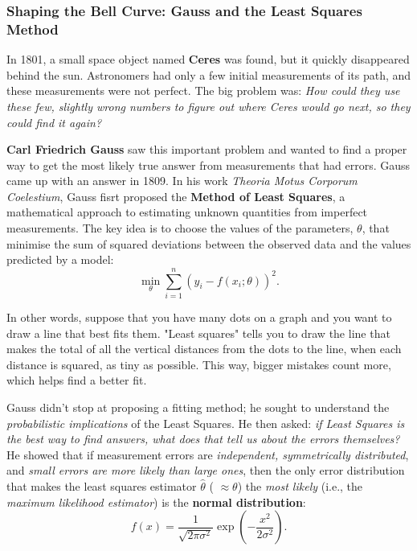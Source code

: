 \vspace{-1em}

\subsubsection{Shaping the Bell Curve: Gauss and the Least Squares Method}

In 1801, a small space object named \textbf{Ceres} was found, but it quickly disappeared behind the sun. Astronomers had only a few initial measurements of its path, and these measurements were not perfect. The big problem was: \textit{How could they use these few, slightly wrong numbers to figure out where Ceres would go next, so they could find it again?}

\textbf{Carl Friedrich Gauss} saw this important problem and wanted to find a proper way to get the most likely true answer from measurements that had errors. Gauss came up with an answer in 1809. In his work \emph{Theoria Motus Corporum Coelestium}, Gauss fisrt proposed the \textbf{Method of Least Squares}, a mathematical approach to estimating unknown quantities from imperfect measurements. %
The key idea is to choose the values of the parameters, $\theta$, that minimise the sum of squared deviations between the observed data and the values predicted by a model:
\[
\min_{\theta} \sum_{i=1}^n (y_i - f(x_i; \theta))^2.
\]

In other words, suppose that you have many dots on a graph and you want to draw a line that best fits them. "Least squares" tells you to draw the line that makes the total of all the vertical distances from the dots to the line, when each distance is squared, as tiny as possible. This way, bigger mistakes count more, which helps find a better fit.

Gauss didn’t stop at proposing a fitting method; he sought to understand the \emph{probabilistic implications} of the Least Squares. He then asked: \textit{if Least Squares is the best way to find answers, what does that tell us about the errors themselves?} He showed that if measurement errors are \textit{independent, symmetrically distributed}, and \textit{small errors are more likely than large ones}, then the only error distribution that makes the least squares estimator $\hat{\theta} $ ( $\approx \theta $) the \emph{most likely} (i.e., the \emph{maximum likelihood estimator}) is the \textbf{normal distribution}:
\[
f(x) = \frac{1}{\sqrt{2\pi\sigma^2}} \exp\left(-\frac{x^2}{2\sigma^2}\right).
\]

